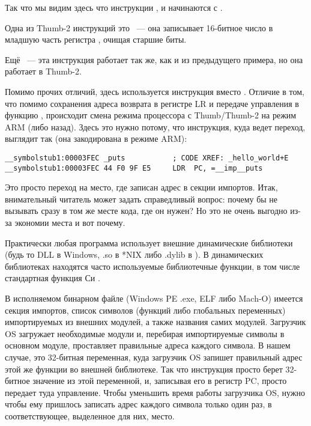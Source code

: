 Так что мы видим здесь что инструкции ,  и  начинаются с .

Одна из Thumb-2 инструкций это
~--- она записывает 16-битное число в младшую часть регистра , очищая старшие биты.

Ещё ~--- эта инструкция работает так же, как и  из предыдущего примера, но она работает в Thumb-2.

Помимо прочих отличий, здесь используется инструкция  вместо .
Отличие в том, что помимо сохранения адреса возврата в регистре \ac{LR} и передаче управления 
в функцию \puts, происходит смена режима процессора с Thumb/Thumb-2 на режим ARM (либо назад).
Здесь это нужно потому, что инструкция, куда ведет переход, выглядит так (она закодирована в режиме ARM):

\begin{lstlisting}
__symbolstub1:00003FEC _puts           ; CODE XREF: _hello_world+E
__symbolstub1:00003FEC 44 F0 9F E5     LDR  PC, =__imp__puts
\end{lstlisting}

Это просто переход на место, где записан адрес \puts в секции импортов.
Итак, внимательный читатель может задать справедливый вопрос: почему бы не вызывать \puts сразу в 
том же месте кода, где он нужен?
Но это не очень выгодно из-за экономии места и вот почему.

Практически любая программа использует внешние динамические библиотеки (будь то DLL в Windows, .so в *NIX 
либо .dylib в \MacOSX).
В динамических библиотеках находятся часто используемые библиотечные функции, в том числе стандартная функция Си \puts.

В исполняемом бинарном файле 
(Windows PE .exe, ELF либо Mach-O) имеется секция импортов, список символов (функций либо глобальных переменных) импортируемых из внешних модулей, а также названия самих модулей.
Загрузчик \ac{OS} загружает необходимые модули и, перебирая импортируемые символы в основном модуле, проставляет правильные адреса каждого символа.
В нашем случае,  
это 32-битная переменная, куда загрузчик \ac{OS} запишет правильный адрес этой же функции во внешней библиотеке. 
Так что инструкция  просто берет 32-битное значение из этой переменной, и, записывая его в регистр \ac{PC}, просто передает туда управление.
Чтобы уменьшить время работы загрузчика \ac{OS}, нужно чтобы ему пришлось записать адрес каждого символа только один раз, в соответствующее, выделенное для них, место.

